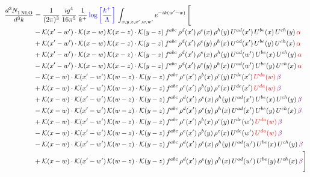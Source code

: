 \documentclass[9pt]{article}
\numberwithin{equation}{section}
\begin{document}
\begin{align}
  \frac{d^{3}N_{1\,\rm NLO}^{\rm}}{d^{3}k}  & = \frac{1}{(2\pi)^{3}}\, \frac{ig^{4}}{16\pi^{5}}\, \frac{1}{k^{+}}\, {\color{blue}\log{\left[\frac{k^{+}}{\Lambda}\right]}}\,\int_{x,y,z,x^{\prime},w,w^{\prime}}e^{-ik(w^{\prime}-w)}\, \Bigg[\notag \\ & -\mathcal{K}(x'-w')\cdot\mathcal{K}(x-w)\,\mathcal{K}(x-z)\cdot\mathcal{K}(y-z)\, f^{abc}\,\rho^{d}(x')\,\rho^{e}(x)\,\rho^{h}(y)\,U^{ad}(x')\,U^{be}(x)\,U^{ch}(y)\,{\color{red}\alpha}\notag\\
&+\mathcal{K}(x'-w')\cdot\mathcal{K}(x-w)\,\mathcal{K}(x-z)\cdot\mathcal{K}(y-z)\, f^{abc}\,\rho^{d}(x')\,\rho^{e}(y)\,\rho^{h}(x)\,U^{ad}(x')\,U^{be}(y)\,U^{ch}(x)\,{\color{red}\alpha}\notag\\ & +\mathcal{K}(x'-w')\cdot\mathcal{K}(x-w)\,\mathcal{K}(x-z)\cdot\mathcal{K}(y-z)\, f^{abc}\,\rho^{d}(x')\,\rho^{e}(x)\,\rho^{h}(y)\,U^{ad}(w')\,U^{be}(x)\,U^{ch}(y)\,{\color{red}\alpha}\notag\\ & -\mathcal{K}(x'-w')\cdot\mathcal{K}(x-w)\,\mathcal{K}(x-z)\cdot\mathcal{K}(y-z)\, f^{abc}\,\rho^{d}(x')\,\rho^{e}(y)\,\rho^{h}(x)\,U^{ad}(w')\,U^{be}(y)\,U^{ch}(x)\,{\color{red}\alpha}\notag\\ & - \mathcal{K}(x-w) \cdot \mathcal{K}(x'-w')\, \mathcal{K}(w-z)\cdot \mathcal{K}(y-z)\, f^{abc}\, \rho^{e}(x')\,\rho^{b}(x)\,\rho^{c}(y)\,U^{de}(x')\,{\color{red}U^{da}(w)}\,{\color{violet} \beta} \notag \\ &  +  \mathcal{K}(x-w) \cdot \mathcal{K}(x'-w')\, \mathcal{K}(w-z)\cdot \mathcal{K}(y-z)\, f^{abc}\, \rho^{e}(x')\,\rho^{b}(y)\,\rho^{c}(x)\,U^{de}(x')\,{\color{red}U^{da}(w)}\,{\color{violet} \beta} \notag \\ & + \mathcal{K}(x-w) \cdot \mathcal{K}(x'-w')\, \mathcal{K}(w-z)\cdot \mathcal{K}(y-z)\, f^{abc}\, \rho^{d}(x')\,\rho^{e}(x)\,\rho^{h}(y)\,U^{ad}(x')\,U^{be}(x)\,U^{ch}(y)\, {\color{violet} \beta} \notag \\ & - \mathcal{K}(x-w) \cdot \mathcal{K}(x'-w')\, \mathcal{K}(w-z)\cdot \mathcal{K}(y-z)\, f^{abc}\, \rho^{d}(x')\,\rho^{e}(y)\,\rho^{h}(x)\,U^{ad}(x')\,U^{be}(y)\,U^{ch}(x)\, {\color{violet} \beta} \notag \\ & + \mathcal{K}(x-w) \cdot \mathcal{K}(x'-w')\, \mathcal{K}(w-z)\cdot \mathcal{K}(y-z)\, f^{abc}\, \rho^{e}(x')\,\rho^{b}(x)\,\rho^{c}(y)\,U^{de}(w')\,{\color{red}U^{da}(w)}\,{\color{violet} \beta} \notag \\ & - \mathcal{K}(x-w) \cdot \mathcal{K}(x'-w')\, \mathcal{K}(w-z)\cdot \mathcal{K}(y-z)\, f^{abc}\, \rho^{e}(x')\,\rho^{b}(y)\,\rho^{c}(x)\,U^{de}(w')\,{\color{red}U^{da}(w)}\, {\color{violet} \beta} \notag \\ & - \mathcal{K}(x-w) \cdot \mathcal{K}(x'-w')\, \mathcal{K}(w-z)\cdot \mathcal{K}(y-z)\, f^{abc}\, \rho^{d}(x')\,\rho^{e}(x)\,\rho^{h}(y)\,U^{ad}(w')\,U^{be}(x)\,U^{ch}(y)\, {\color{violet} \beta} \notag \\ & + \mathcal{K}(x-w) \cdot \mathcal{K}(x'-w')\, \mathcal{K}(w-z)\cdot \mathcal{K}(y-z)\, f^{abc}\, \rho^{d}(x')\,\rho^{e}(y)\,\rho^{h}(x)\,U^{ad}(w')\,U^{be}(y)\,U^{ch}(x)\, {\color{violet} \beta} \Bigg]
\end{align}
\end{document}
